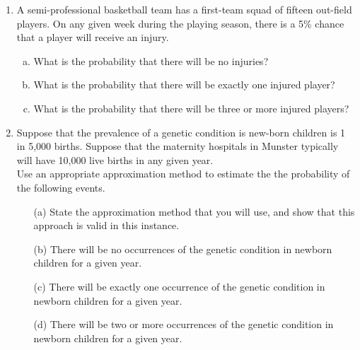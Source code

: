 \documentclass[a4paper,12pt]{article}
\begin{document}

\begin{enumerate}



\item A semi-professional basketball team has a first-team squad of fifteen out-field players.
On any given week during the playing season, there is a 5\% chance that a player will receive an injury.
\begin{enumerate}[(a)]
\item  What is the probability that there will be no injuries?
  \item  What is the probability that there will be exactly one injured player?
  \item  What is the probability that there will be three or more injured players?
  \end{enumerate}
\smallskip 
\item Suppose that the prevalence of a genetic condition is new-born children is 1 in 5,000 births. Suppose that the maternity hospitals in Munster typically will have 10,000 live births in any given year.\\ 
Use an appropriate approximation method to estimate the the probability of the following events.

\begin{itemize}
\item[(a)]  State the approximation method that you will use, and show that this approach is valid in this instance.
\item [(b)] There will be no occurrences of the genetic condition in newborn children for a given year.
\item [(c)] There will be exactly one occurrence of the genetic condition in newborn children for a given year.
\item [(d)] There will be two or more occurrences of the genetic condition in newborn children for a given year.
\end{itemize}


\end{enumerate}

\end{document}
